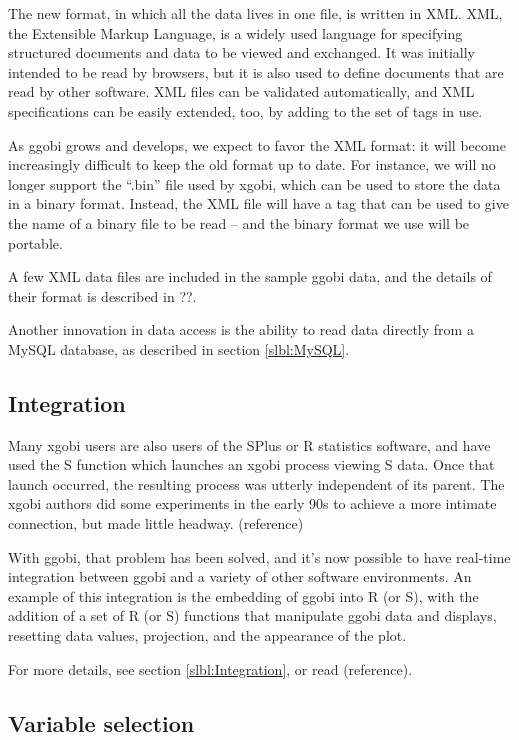 \documentclass[11pt]{article}
\begin{document}
The new format, in which all the data lives in one file, is written
in XML.  XML, the Extensible Markup Language, is a widely used
language for specifying structured documents and data to be viewed
and exchanged.  It was initially intended to be read by browsers, but
it is also used to define documents that are read by other software.
XML files can be validated automatically, and XML specifications can
be easily extended, too, by adding to the set of tags in use.

As ggobi grows and develops, we expect to favor the XML format:  it
will become increasingly difficult to keep the old format up to
date.  For instance, we will no longer support the ``.bin'' file used
by xgobi, which can be used to store the data in a binary format.
Instead, the XML file will have a tag that can be used to give the
name of a binary file to be read -- and the binary format we use will
be portable.

A few XML data files are included in the sample ggobi data, and
the details of their format is described in ??.

Another innovation in data access is the ability to read data
directly from a MySQL database, as described in section \ref{slbl:MySQL}.

\subsection{Integration}

Many xgobi users are also users of the SPlus or R statistics
software, and have used the S function which launches an xgobi
process viewing S data.  Once that launch occurred, the resulting
process was utterly independent of its parent.  The xgobi authors
did some experiments in the early 90s to achieve a more intimate
connection, but made little headway.  (reference)

With ggobi, that problem has been solved, and it's now possible
to have real-time integration between ggobi and a variety of
other software environments.  An example of this integration is
the embedding of ggobi into R (or S), with the addition of a set of
R (or S) functions that manipulate ggobi data and displays,
resetting data values, projection, and the appearance of the plot.

For more details, see section \ref{slbl:Integration}, or read
(reference).

\subsection {Variable selection}
\end{document}
